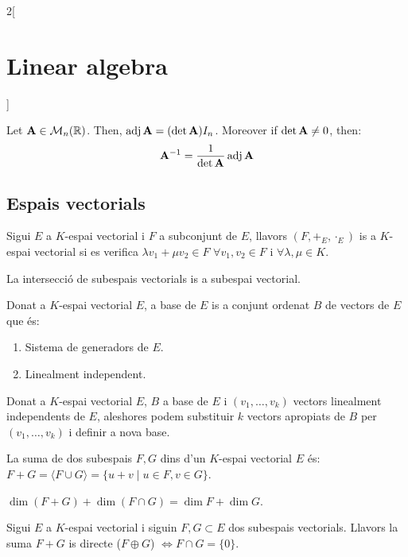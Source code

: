 \documentclass[../../../main.tex]{subfiles}
\begin{document}
\begin{multicols}{2}[\section{Linear algebra}]
\begin{definition}
\end{definition}
\begin{theorem}
    Let $\mathbf{A}\in\mathcal{M}_n(\mathbb{R})$. Then, $\operatorname{adj}\mathbf{A}=(\det \mathbf{A})I_n$. Moreover if $\det \mathbf{A}\ne 0$, then: $$\mathbf{A}^{-1}=\frac{1}{\det \mathbf{A}}\operatorname{adj}\mathbf{A}$$
\end{theorem}
\subsection{Espais vectorials}
\begin{definition}
Sigui $E$ a $K$-espai vectorial i $F$ a subconjunt de $E$, llavors $(F,+_E,\cdot_E)$ is a $K$-espai vectorial si es verifica $\lambda v_1+\mu v_2\in F$ $\forall v_1,v_2\in F$ i $\forall\lambda,\mu\in K$.
\end{definition}
\begin{lemma}
La intersecció de subespais vectorials is a subespai vectorial.
\end{lemma}
\begin{definition}
Donat a $K$-espai vectorial $E$, a base de $E$ is a conjunt ordenat $B$ de vectors de $E$ que és: 
\begin{enumerate}
    \item Sistema de generadors de $E$.
    \item Linealment independent.
\end{enumerate}
\end{definition}
\begin{theorem}
Donat a $K$-espai vectorial $E$, $B$ a base de $E$ i $(v_1,\ldots,v_k)$ vectors linealment independents de $E$, aleshores podem substituir $k$ vectors apropiats de $B$ per $(v_1,\ldots,v_k)$ i definir a nova base.
\end{theorem}
\begin{definition}
La suma de dos subespais $F,G$ dins d'un $K$-espai vectorial $E$ és: $F+G=\langle F\cup G\rangle=\{u+v\mid u\in F,v\in G\}$.
\end{definition}
\begin{prop}
$\dim (F+G)+\dim(F\cap G)=\dim F+\dim G$.
\end{prop}
\begin{definition}
Sigui $E$ a $K$-espai vectorial i siguin $F,G\subset E$ dos subespais vectorials. Llavors la suma $F+G$ is directe ($F\oplus G$) $\iff F\cap G=\{0\}$.
\end{definition}

\end{multicols}
\end{document}
